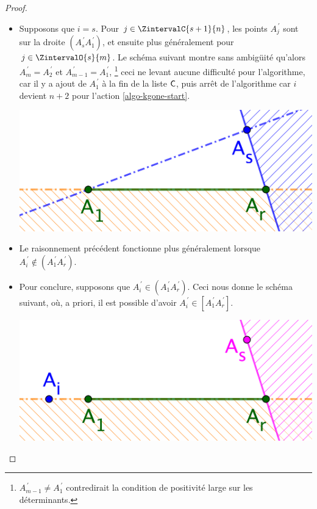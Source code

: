 \begin{proof}
\begin{itemize}
        \item Supposons que $i = s$. 
        Pour $j \in \ZintervalC{s+1}{n}$, les points $A^{\,\prime}_j$ sont sur la droite $( A^{\,\prime}_s A^{\,\prime}_1)$, 
        et ensuite plus généralement pour $j \in \ZintervalO{s}{m}$. 
        Le schéma suivant montre sans ambigüité qu'alors
        $A^{\,\prime}_m = A^{\,\prime}_2$
        et
        $A^{\,\prime}_{m-1} = A^{\,\prime}_1$,%
        \footnote{
            $A^{\,\prime}_{m-1} \neq A^{\,\prime}_1$ contredirait la condition de positivité large sur les déterminants.
        }
        ceci ne levant aucune difficulté pour l'algorithme, car il y a ajout de $A^{\,\prime}_1$ à la fin de la liste $\mathsf{C}$, puis arrêt de l'algorithme car $i$ devient $n+2$ pour l'action \ref{algo-kgone-start}.
        \begin{center}
        	\includegraphics[scale=.4]{content/polygon/at-least-one/algo-kgone-terminate-1.png}
        \end{center}


        \item Le raisonnement précédent fonctionne plus généralement lorsque $A^{\,\prime}_i \notin (A^{\,\prime}_1 A^{\,\prime}_r)$.


        \item Pour conclure, supposons que $A^{\,\prime}_i \in (A^{\,\prime}_1 A^{\,\prime}_r)$.
       Ceci nous donne le schéma suivant, où, a priori, il est possible d'avoir $A^{\,\prime}_i \in [A^{\,\prime}_1 A^{\,\prime}_r]$. 
        \begin{center}
        	\includegraphics[scale=.4]{content/polygon/at-least-one/algo-kgone-terminate-2.png}
        \end{center}
        

\end{itemize}
\end{proof}
